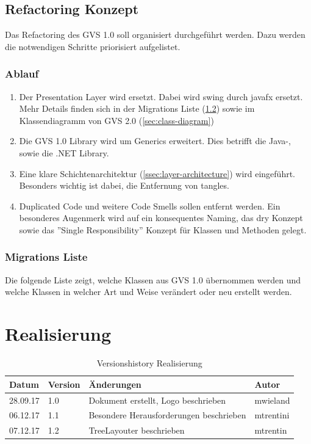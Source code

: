 \documentclass[11pt,a4paper,english,oneside]{book}
\numberwithin{equation}{chapter}
\begin{document}
	\section{Refactoring Konzept} \label{sec:refactroing-conpet}
	Das Refactoring des GVS 1.0 soll organisiert durchgeführt werden. Dazu werden die notwendigen Schritte priorisiert aufgelistet.
		
	\subsection{Ablauf}\label{ssec:ablauf}
	\begin{enumerate}
		\item Der Presentation Layer wird ersetzt. Dabei wird \gls{swing} durch \gls{javafx} ersetzt. Mehr Details finden sich in der Migrations Liste (\ref{ssec:class-refactroing-list}) sowie im Klassendiagramm von GVS 2.0 (\ref{sec:class-diagram})
		\item Die GVS 1.0 Library wird um Generics erweitert. Dies betrifft die Java-, sowie die .NET Library.
		\item Eine klare Schichtenarchitektur (\ref{ssec:layer-architecture}) wird eingeführt. Besonders wichtig ist dabei, die Entfernung von \gls{tangle}s.
		\item Duplicated Code und weitere Code Smells sollen entfernt werden. Ein besonderes Augenmerk wird auf ein konsequentes Naming, das \gls{dry} Konzept sowie das ''Single Responsibility'' Konzept für Klassen und Methoden gelegt.
	\end{enumerate}

	\subsection{Migrations Liste}
	\label{ssec:class-refactroing-list}
	Die folgende Liste zeigt, welche Klassen aus GVS 1.0 übernommen werden und welche Klassen in welcher Art und Weise verändert oder neu erstellt werden.
	
	
	
	\chapter{Realisierung}
		
	\begin{table}[h!]
	\centering
	\begin{tabularx}{\linewidth}{l l X l}
		\toprule 
		Datum & Version & Änderungen & Autor \\
		\midrule
		28.09.17 & 1.0 & Dokument erstellt, Logo beschrieben & mwieland \\
		06.12.17 & 1.1 & Besondere Herausforderungen beschrieben & mtrentini \\
		07.12.17 & 1.2 & TreeLayouter beschrieben & mtrentin \\
		\bottomrule 
	\end{tabularx} 
	\caption{Versionshistory Realisierung} 
	\end{table}
	
\end{document}
